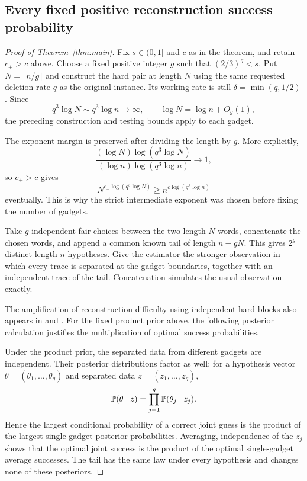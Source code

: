 \subsection{Every fixed positive reconstruction success probability}

\begin{proof}[Proof of Theorem~\ref{thm:main}]
Fix $s\in(0,1]$ and $c$ as in the theorem, and retain $c_+>c$ above.  Choose a fixed positive integer $g$ such that $(2/3)^g<s$.  Put $N=\lfloor n/g\rfloor$ and construct the hard pair at length $N$ using the same requested deletion rate $q$ as the original instance.  Its working rate is still $\delta=\min(q,1/2)$.  Since
\[
 q^3\log N\sim q^3\log n\to\infty,
 \qquad \log N=\log n+O_g(1),
\]
the preceding construction and testing bounds apply to each gadget.

The exponent margin is preserved after dividing the length by $g$.  More explicitly,
\[
 \frac{(\log N)\log(q^3\log N)}
      {(\log n)\log(q^3\log n)}\longrightarrow1,
\]
so $c_+>c$ gives
\begin{equation}\label{eq:gadget-margin}
 N^{c_+\log(q^3\log N)}
 \ge n^{c\log(q^3\log n)}
\end{equation}
eventually.  This is why the strict intermediate exponent was chosen before fixing the number of gadgets.

Take $g$ independent fair choices between the two length-$N$ words, concatenate the chosen words, and append a common known tail of length $n-gN$.  This gives $2^g$ distinct length-$n$ hypotheses.  Give the estimator the stronger observation in which every trace is separated at the gadget boundaries, together with an independent trace of the tail.  Concatenation simulates the usual observation exactly.

The amplification of reconstruction difficulty using independent hard blocks also appears in \citet[Section 3.3]{MPV2014} and \citet[Section 4]{HoldenLyons2020}.  For the fixed product prior above, the following posterior calculation justifies the multiplication of optimal success probabilities.

Under the product prior, the separated data from different gadgets are independent.  Their posterior distributions factor as well: for a hypothesis vector $\theta=(\theta_1,\ldots,\theta_g)$ and separated data $z=(z_1,\ldots,z_g)$,
\[
 \mathbb P(\theta\mid z)=\prod_{j=1}^g\mathbb P(\theta_j\mid z_j).
\]
Hence the largest conditional probability of a correct joint guess is the product of the largest single-gadget posterior probabilities.  Averaging, independence of the $z_j$ shows that the optimal joint success is the product of the optimal single-gadget average successes.  The tail has the same law under every hypothesis and changes none of these posteriors.


\end{proof}
